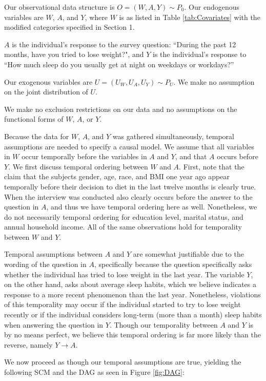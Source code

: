 \documentclass{article}
\begin{document}
Our observational data structure is $O=(W,A,Y) \sim P_0$. Our endogenous variables are $W$, $A$, and $Y$, where $W$ is as listed in Table \ref{tab:Covariates} with the modified categories specified in Section 1.

$A$ is the individual's response to the survey question: ``During the past 12 months, have you tried to lose weight?", and $Y$ is the individual's response to ``How much sleep do you usually get at night on weekdays or workdays?''  

Our exogenous variables are $U = (U_W, U_A, U_Y) \sim P_U$. We make no assumption on the joint distribution of $U$.  

We make no exclusion restrictions on our data and no assumptions on the functional forms of $W$, $A$, or $Y$.

Because the data for $W$, $A$, and $Y$ was gathered simultaneously, temporal assumptions are needed to specify a causal model. We assume that all variables in $W$ occur temporally before the variables in $A$ and $Y$, and that $A$ occurs before $Y$. We first discuss temporal ordering between $W$ and $A$. First, note that the claim that the subjects gender, age, race, and BMI one year ago appear temporally before their decision to diet in the last twelve months is clearly true. When the interview was conducted also clearly occurs before the answer to the question in $A$, and thus we have temporal ordering here as well. Nonetheless, we do not necessarily temporal ordering for education level, marital status, and annual household income. All of the same observations hold for temporality between $W$ and $Y$.

Temporal assumptions between $A$ and $Y$ are somewhat justifiable due to the wording of the question in $A$, specifically because the question specifically asks whether the individual has tried to lose weight in the last year. The variable $Y$, on the other hand, asks about average sleep habits, which we believe indicates a response to a more recent phenomenon than the last year. Nonetheless, violations of this temporality may occur if the individual started to try to lose weight recently or if the individual considers long-term (more than a month) sleep habits when answering the question in $Y$. Though our temporality between $A$ and $Y$ is by no means perfect, we believe this temporal ordering is far more likely than the reverse, namely $Y\rightarrow A$. 

We now proceed as though our temporal assumptions are true, yielding the following SCM and the DAG as seen in Figure \ref{fig:DAG}:
\end{document}
